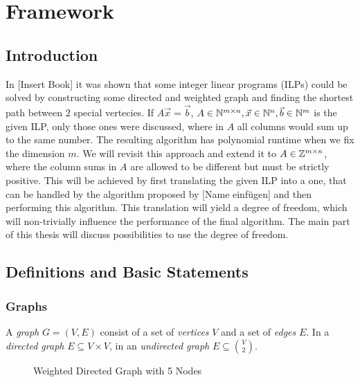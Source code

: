 \chapter{Framework}
\section{Introduction}
In [Insert Book] it was shown that some integer linear programs (ILPs) could be solved by constructing some directed and weighted graph and finding the shortest path between 2 special vertecies. If $A\vec x = \vec b$, $A\in \mathbb{N}^{m \times n}, \vec x \in \mathbb{N}^n, \vec b \in \mathbb{N}^m$ is the given ILP, only those ones were discussed, where in $A$ all columns would sum up to the same number. The resulting algorithm has polynomial runtime when we fix the dimension $m$. We will revisit this approach and extend it to $A\in\mathbb{Z}^{m \times n}$, where the column sums in $A$ are allowed to be different but must be strictly positive. This will be achieved by first translating the given ILP into a one, that can be handled by the algorithm proposed by [Name einfügen] and then performing this algorithm. This translation will yield a degree of freedom, which will non-trivially influence the performance of the final algorithm. The main part of this thesis will discuss possibilities to use the degree of freedom. 

\section{Definitions and Basic Statements}
\subsection{Graphs}
\begin{definition}
    A \textit{graph} $G = (V, E)$ consist of a set of \textit{vertices} $V$ and a set of \textit{edges} $E$. In a \textit{directed graph} $E \subseteq V \times V$, in an \textit{undirected graph} $E \subseteq \binom{V}{2}$. 
\end{definition}
\begin{figure}[ht]
    \centering
    \caption{Weighted Directed Graph with 5 Nodes}
\end{figure}

